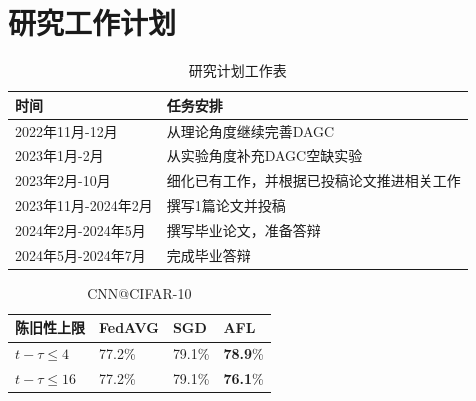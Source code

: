 \chapter{研究工作计划}

\begin{table}
  \centering
  \caption{研究计划工作表}
  \begin{tabular}{ll}
    \toprule
    时间          & 任务安排                         \\
    \midrule
    2022年11月-12月  & 从理论角度继续完善DAGC\\
    2023年1月-2月   & 从实验角度补充DAGC空缺实验       \\
    2023年2月-10月  & 细化已有工作，并根据已投稿论文推进相关工作    \\
    2023年11月-2024年2月  & 撰写1篇论文并投稿    \\
    2024年2月-2024年5月  & 撰写毕业论文，准备答辩    \\
    2024年5月-2024年7月  & 完成毕业答辩    \\
    \bottomrule
  \end{tabular}
  \label{tab:7}
\end{table}

\begin{table}
  \centering
  \caption{CNN@CIFAR-10}
  \begin{tabular}{llll}
    \toprule
    陈旧性上限  & FedAVG & SGD   & AFL                 \\
    \midrule
    $t-\tau \le 4$  & 77.2\% & 79.1\% & \textbf{78.9}\% \\
    $t-\tau \le 16$  & 77.2\% & 79.1\% & \textbf{76.1}\%      \\
    \bottomrule
  \end{tabular}
  \label{tab:7}
\end{table}